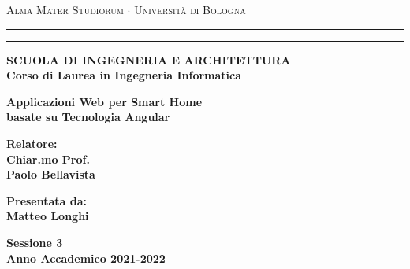 \documentclass[12pt]{report}
\begin{document}
\begin{titlepage}
\begin{center}
{{\Large{\textsc{Alma Mater Studiorum $\cdot$ Universit\`a di
Bologna}}}} \rule[0.1cm]{15.8cm}{0.1mm}
\rule[0.5cm]{15.8cm}{0.6mm}
{\small{\bf SCUOLA DI INGEGNERIA E ARCHITETTURA\\
Corso di Laurea in Ingegneria Informatica }}
\end{center}
\vspace{15mm}
\begin{center}
{\LARGE{\bf Applicazioni Web per Smart Home }}\\
\vspace{3.8mm}
{\LARGE{\bf basate su Tecnologia Angular}}\\
\vspace{3mm}
\end{center}
\vspace{40mm}
\par
\noindent
\begin{minipage}[t]{0.47\textwidth}
{\large{\bf Relatore:\\
Chiar.mo Prof.\\
Paolo Bellavista}}
\vspace{1cm}
\end{minipage}
\hfill
\begin{minipage}[t]{0.47\textwidth}\raggedleft
{\large{\bf Presentata da:\\
Matteo Longhi}}
\end{minipage}
\vspace{20mm}
\begin{center}
{\large{\bf Sessione 3\\
Anno Accademico 2021-2022}}
\end{center}
\end{titlepage}




\newpage
\thispagestyle{empty}
\newpage


\newcommand\blankpage{%
    \null
    \thispagestyle{empty}%
    \addtocounter{page}{-1}%
    \newpage}
\blankpage{}



\tableofcontents


\newpage
\thispagestyle{empty}
\mbox{}
\newpage








\newpage
\thispagestyle{empty}
\mbox{}
\newpage



\newpage

\printbibliography
\end{document}
